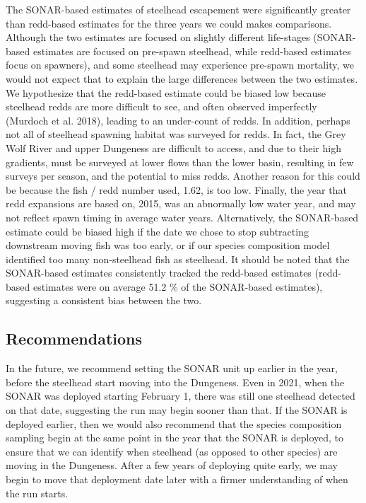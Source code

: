 \documentclass[
]{article}
\begin{document}
The SONAR-based estimates of steelhead escapement were significantly greater than redd-based estimates for the three years we could makes comparisons. Although the two estimates are focused on slightly different life-stages (SONAR-based estimates are focused on pre-spawn steelhead, while redd-based estimates focus on spawners), and some steelhead may experience pre-spawn mortality, we would not expect that to explain the large differences between the two estimates. We hypothesize that the redd-based estimate could be biased low because steelhead redds are more difficult to see, and often observed imperfectly (Murdoch et al. 2018), leading to an under-count of redds. In addition, perhaps not all of steelhead spawning habitat was surveyed for redds. In fact, the Grey Wolf River and upper Dungeness are difficult to access, and due to their high gradients, must be surveyed at lower flows than the lower basin, resulting in few surveys per season, and the potential to miss redds. Another reason for this could be because the fish / redd number used, 1.62, is too low. Finally, the year that redd expansions are based on, 2015, was an abnormally low water year, and may not reflect spawn timing in average water years. Alternatively, the SONAR-based estimate could be biased high if the date we chose to stop subtracting downstream moving fish was too early, or if our species composition model identified too many non-steelhead fish as steelhead. It should be noted that the SONAR-based estimates consistently tracked the redd-based estimates (redd-based estimates were on average 51.2 \% of the SONAR-based estimates), suggesting a consistent bias between the two.

\hypertarget{recommendations}{%
\subsection{Recommendations}\label{recommendations}}

In the future, we recommend setting the SONAR unit up earlier in the year, before the steelhead start moving into the Dungeness. Even in 2021, when the SONAR was deployed starting February 1, there was still one steelhead detected on that date, suggesting the run may begin sooner than that. If the SONAR is deployed earlier, then we would also recommend that the species composition sampling begin at the same point in the year that the SONAR is deployed, to ensure that we can identify when steelhead (as opposed to other species) are moving in the Dungeness. After a few years of deploying quite early, we may begin to move that deployment date later with a firmer understanding of when the run starts.
\end{document}
